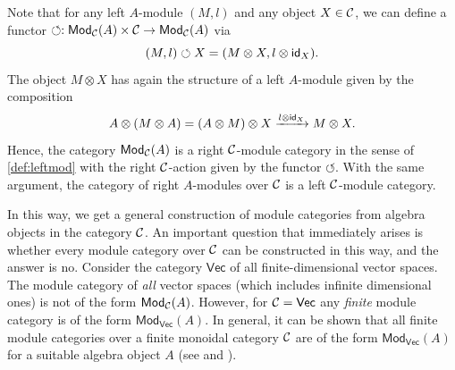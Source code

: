 \begin{rem}
	\label{rem:Caction}
	Note that for any left $A$-module $(M,l)$ and any object $X\in{\mathcal{C}}$, we can define a functor $\circlearrowleft:\mathsf{Mod}_{\mathcal{C}}(A)\times {\mathcal{C}}\to\mathsf{Mod}_{\mathcal{C}}(A)$ via
		\begin{equation}
			(M,l)\circlearrowleft X=(M\otimes X,l\otimes \mathsf{id}_X).
		\end{equation}
	The object $M\otimes X$ has again the structure of a left $A$-module given by the composition
		\begin{equation}
			A\otimes(M\otimes A)=(A\otimes M)\otimes X\xrightarrow{l\otimes\mathsf{id}_X}M\otimes X.
		\end{equation}
	Hence, the category $\mathsf{Mod}_{\mathcal{C}}(A)$ is a right ${\mathcal{C}}$-module category in the sense of \cref{def:leftmod} with the right ${\mathcal{C}}$-action given by the functor $\circlearrowleft$. With the same argument, the category of right $A$-modules over ${\mathcal{C}}$ is a left ${\mathcal{C}}$-module category.
\end{rem}

In this way, we get a general construction of module categories from algebra objects in the category ${\mathcal{C}}$. An important question that immediately arises is whether every module category over ${\mathcal{C}}$ can be constructed in this way, and the answer is no. Consider the category $\mathsf{Vec}$ of all finite-dimensional vector spaces. The module category of \emph{all} vector spaces (which includes infinite dimensional ones) is not of the form $\mathsf{Mod}_{{\mathcal{C}}}(A)$. However, for ${\mathcal{C}}=\mathsf{Vec}$ any \emph{finite} module category is of the form $\mathsf{Mod}_{\mathsf{Vec}}(A)$. In general, it can be shown that all finite module categories over a finite monoidal category ${\mathcal{C}}$ are of the form $\mathsf{Mod}_{\mathsf{Vec}}(A)$ for a suitable algebra object $A$ (see \cite[Thm.\ 7.10.1]{Etingof2015} and \cite{Ostrik2003}).

